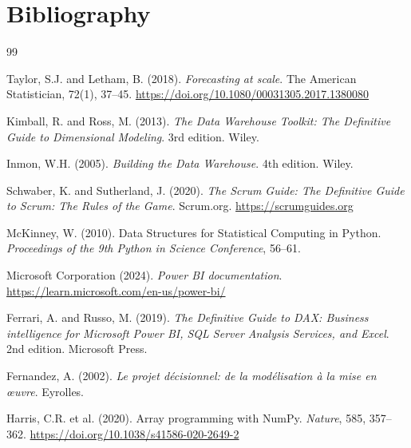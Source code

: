 \documentclass[12pt, a4paper]{report}
\begin{document}
\chapter*{Bibliography}

\begin{thebibliography}{99}

Taylor, S.J. and Letham, B. (2018).
\textit{Forecasting at scale}.
The American Statistician, 72(1), 37--45.
\url{https://doi.org/10.1080/00031305.2017.1380080}

Kimball, R. and Ross, M. (2013).
\textit{The Data Warehouse Toolkit: The Definitive Guide to Dimensional Modeling}.
3rd edition. Wiley.

Inmon, W.H. (2005).
\textit{Building the Data Warehouse}.
4th edition. Wiley.

Schwaber, K. and Sutherland, J. (2020).
\textit{The Scrum Guide: The Definitive Guide to Scrum: The Rules of the Game}.
Scrum.org. \url{https://scrumguides.org}

McKinney, W. (2010).
Data Structures for Statistical Computing in Python.
\textit{Proceedings of the 9th Python in Science Conference}, 56--61.

Microsoft Corporation (2024).
\textit{Power BI documentation}.
\url{https://learn.microsoft.com/en-us/power-bi/}

Ferrari, A. and Russo, M. (2019).
\textit{The Definitive Guide to DAX: Business intelligence for Microsoft Power BI,
SQL Server Analysis Services, and Excel}.
2nd edition. Microsoft Press.

Fernandez, A. (2002).
\textit{Le projet décisionnel: de la modélisation à la mise en œuvre}.
Eyrolles.

Harris, C.R. et al. (2020).
Array programming with NumPy.
\textit{Nature}, 585, 357--362.
\url{https://doi.org/10.1038/s41586-020-2649-2}

\end{thebibliography}
\end{document}
